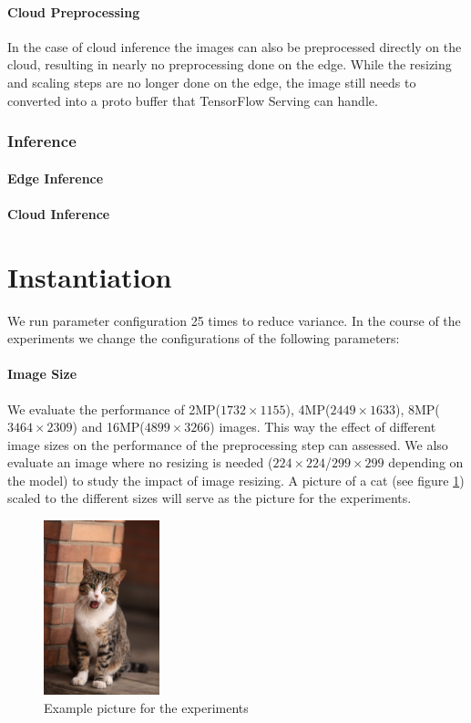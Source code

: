 \paragraph{Cloud Preprocessing}
In the case of cloud inference the images can also be preprocessed directly on the cloud, resulting in nearly no preprocessing done on the edge. While the resizing and scaling steps are no longer done on the edge, the image still needs to converted into a proto buffer that TensorFlow Serving can handle.
\subsubsection{Inference}
\paragraph{Edge Inference}
\paragraph{Cloud Inference}
\section{Instantiation}
We run parameter configuration 25 times to reduce variance.
In the course of the experiments we change the configurations of the following parameters:
\paragraph{Image Size}
We evaluate the performance of 2MP($1732\times1155$), 4MP($2449\times1633$), 8MP($3464\times2309$) and 16MP($4899\times3266$) images. This way the effect of different image sizes on the performance of the preprocessing step can assessed. We also evaluate an image where no resizing is needed ($224\times224$/$299\times299$ depending on the model) to study the impact of image resizing. A picture of a cat (see figure \ref{fig:cat}) scaled to the different sizes will serve as the picture for the experiments.
\begin{figure}[H]
\centering
\includegraphics[width=0.3\textwidth]{./Bilder/European_cat_02_16_mp.jpg}
\caption{Example picture for the experiments \cite{cat}}
\label{fig:cat}
\end{figure}
